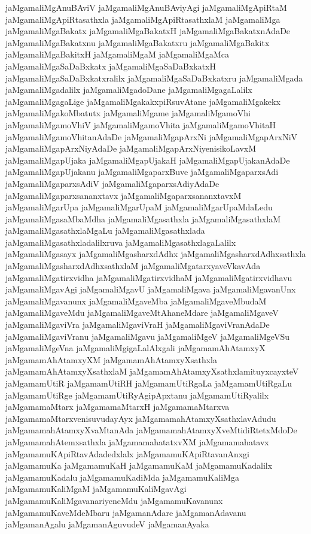 {jaMgamaliMgAnuBAviV
jaMgamaliMgAnuBAviyAgi
jaMgamaliMgApiRtaM
jaMgamaliMgApiRtasathxla
jaMgamaliMgApiRtasathxlaM
jaMgamaliMga
jaMgamaliMgaBakatx
jaMgamaliMgaBakatxH
jaMgamaliMgaBakatxnAdaDe
jaMgamaliMgaBakatxnu
jaMgamaliMgaBakatxru
jaMgamaliMgaBakitx
jaMgamaliMgaBakitxH
jaMgamaliMgaM
jaMgamaliMgaMca
jaMgamaliMgaSaDaBxkatx
jaMgamaliMgaSaDaBxkatxH
jaMgamaliMgaSaDaBxkatxralilx
jaMgamaliMgaSaDaBxkatxru
jaMgamaliMgada
jaMgamaliMgadalilx
jaMgamaliMgadoDane
jaMgamaliMgagaLalilx
jaMgamaliMgagaLige
jaMgamaliMgakakxpiRsuvAtane
jaMgamaliMgakekx
jaMgamaliMgakoMbatutx
jaMgamaliMgame
jaMgamaliMgamoVhi
jaMgamaliMgamoVhiV
jaMgamaliMgamoVhita
jaMgamaliMgamoVhitaH
jaMgamaliMgamoVhitanAdaDe
jaMgamaliMgapArxNi
jaMgamaliMgapArxNiV
jaMgamaliMgapArxNiyAdaDe
jaMgamaliMgapArxNiyenisikoLavxM
jaMgamaliMgapUjaka
jaMgamaliMgapUjakaH
jaMgamaliMgapUjakanAdaDe
jaMgamaliMgapUjakanu
jaMgamaliMgaparxBuve
jaMgamaliMgaparxsAdi
jaMgamaliMgaparxsAdiV
jaMgamaliMgaparxsAdiyAdaDe
jaMgamaliMgaparxsananxtavx
jaMgamaliMgaparxsananxtavxM
jaMgamaliMgarUpa
jaMgamaliMgarUpaM
jaMgamaliMgarUpaMdaLedu
jaMgamaliMgasaMbaMdha
jaMgamaliMgasathxla
jaMgamaliMgasathxlaM
jaMgamaliMgasathxlaMgaLu
jaMgamaliMgasathxlada
jaMgamaliMgasathxladalilxruva
jaMgamaliMgasathxlagaLalilx
jaMgamaliMgasayx
jaMgamaliMgasharxdAdhx
jaMgamaliMgasharxdAdhxsathxla
jaMgamaliMgasharxdAdhxsathxlaM
jaMgamaliMgatarxyaveVkavAda
jaMgamaliMgatirxvidha
jaMgamaliMgatirxvidhaM
jaMgamaliMgatirxvidhavu
jaMgamaliMgavAgi
jaMgamaliMgavU
jaMgamaliMgava
jaMgamaliMgavanUnx
jaMgamaliMgavanunx
jaMgamaliMgaveMba
jaMgamaliMgaveMbudaM
jaMgamaliMgaveMdu
jaMgamaliMgaveMtAhaneMdare
jaMgamaliMgaveV
jaMgamaliMgaviVra
jaMgamaliMgaviVraH
jaMgamaliMgaviVranAdaDe
jaMgamaliMgaviVranu
jaMgamaliMgavu
jaMgamaliMgeV
jaMgamaliMgeVSu
jaMgamaliMgeVna
jaMgamaliMgigaLalAlxgali
jaMgamamAhAtamxyX
jaMgamamAhAtamxyXM
jaMgamamAhAtamxyXsathxla
jaMgamamAhAtamxyXsathxlaM
jaMgamamAhAtamxyXsathxlamituyxcayxteV
jaMgamamUtiR
jaMgamamUtiRH
jaMgamamUtiRgaLa
jaMgamamUtiRgaLu
jaMgamamUtiRge
jaMgamamUtiRyAgipApxtanu
jaMgamamUtiRyalilx
jaMgamamaMtarx
jaMgamamaMtarxH
jaMgamamaMtarxva
jaMgamamaMtarxvenisuvudayAyx
jaMgamamahAtamxyXsathxlavAdudu
jaMgamamahAtamxyXvaMtanAda
jaMgamamahAtamxyXveMtidiRtetxMdoDe
jaMgamamahAtemxsathxla
jaMgamamahatatxvXM
jaMgamamahatavx
jaMgamamuKApiRtavAdadedxlalx
jaMgamamuKApiRtavanAnxgi
jaMgamamuKa
jaMgamamuKaH
jaMgamamuKaM
jaMgamamuKadalilx
jaMgamamuKadalu
jaMgamamuKadiMda
jaMgamamuKaliMga
jaMgamamuKaliMgaM
jaMgamamuKaliMgavAgi
jaMgamamuKaliMgavanariyeneMdu
jaMgamamuKavanunx
jaMgamamuKaveMdeMbaru
jaMgamanAdare
jaMgamanAdavanu
jaMgamanAgalu
jaMgamanAguvudeV
jaMgamanAyaka
}
